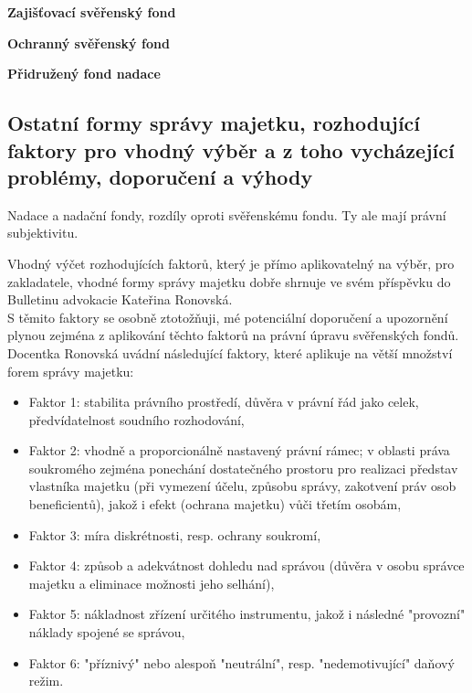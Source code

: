 \documentclass{article}
\begin{document}
\textbf{Zajišťovací svěřenský fond}

\textbf{Ochranný svěřenský fond}

\textbf{Přidružený fond nadace}

\subsection{Ostatní formy správy majetku, rozhodující faktory pro vhodný výběr a z toho vycházející problémy, doporučení a výhody}

Nadace a nadační fondy, rozdíly oproti svěřenskému fondu. Ty ale mají právní subjektivitu.


Vhodný výčet rozhodujících faktorů, který je přímo aplikovatelný na výběr, pro zakladatele, vhodné formy správy majetku dobře shrnuje ve svém příspěvku do Bulletinu advokacie Kateřina Ronovská.\\

S těmito faktory se osobně ztotožňuji, mé potenciální doporučení a upozornění plynou zejména z aplikování těchto faktorů na právní úpravu svěřenských fondů.\\

Docentka Ronovská uvádní následující faktory, které aplikuje na větší množství forem správy majetku:

\begin{itemize}
	\item Faktor 1: stabilita právního prostředí, důvěra v právní řád jako celek, předvídatelnost soudního rozhodování,
	\item Faktor 2: vhodně a proporcionálně nastavený právní rámec; v oblasti práva soukromého zejména ponechání dostatečného prostoru pro realizaci představ vlastníka majetku (při vymezení účelu, způsobu správy, zakotvení práv osob beneficientů), jakož i efekt (ochrana majetku) vůči třetím osobám,
	\item Faktor 3: míra diskrétnosti, resp. ochrany soukromí,
	\item Faktor 4: způsob a adekvátnost dohledu nad správou (důvěra v osobu správce majetku a eliminace možnosti jeho selhání),
	\item Faktor 5: nákladnost zřízení určitého instrumentu, jakož i následné "provozní" náklady spojené se správou,
	\item Faktor 6: "příznivý" nebo alespoň "neutrální", resp. "nedemotivující" daňový režim.
\end{itemize}
\end{document}
